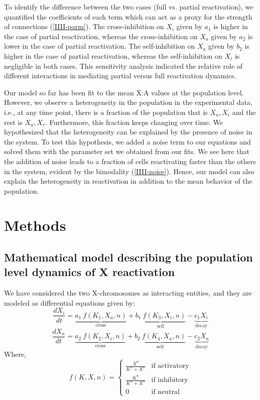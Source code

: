 \documentclass[11pt,a4paper]{article}
\begin{document}
To identify the difference between the two cases (full vs. partial reactivation), we quantified the coefficients of each term which can act as a proxy for the strength of connections (\autoref{IIII-parm}). The cross-inhibition on $X_i$ given by $a_1$ is higher in the case of partial reactivation, whereas the cross-inhibition on $X_a$ given by $a_2$ is lower in the case of partial reactivation. The self-inhibition on $X_a$ given by $b_2$ is higher in the case of partial reactivation, whereas the self-inhibition on $X_i$ is negligible in both cases. This sensitivity analysis indicated the relative role of different interactions in mediating partial versus full reactivation dynamics.

Our model so far has been fit to the mean X:A values at the population level. However, we observe a heterogeneity in the population in the experimental data, i.e., at any time point, there is a fraction of the population that is $X_a, X_i$ and the rest is $X_a, X_r$. Furthermore, this fraction keeps changing over time. We hypothesized that the heterogeneity can be explained by the presence of noise in the system. To test this hypothesis, we added a noise term to our equations and solved them with the parameter set we obtained from our fits. We see here that the addition of noise leads to a fraction of cells reactivating faster than the others in the system, evident by the bimodality (\autoref{IIII-noise}). Hence, our model can also explain the heterogeneity in reactivation in addition to the mean behavior of the population. 

\section{Methods}

\subsection*{Mathematical model describing the population level dynamics of X reactivation}
We have considered the two X-chromosomes as interacting entities, and they are modeled as differential equations given by:
\begin{equation}
    \frac{dX_i}{dt} = \underbrace{a_1\ f(K_1,X_a,n)}_\text{cross} + \underbrace{b_1\ f(K_3,X_i,n)}_\text{self} - \underbrace{c_1 X_i}_\text{decay} 
    \label{Xi-eq}
\end{equation}
\begin{equation}
    \frac{dX_a}{dt} = \underbrace{a_2\ f(K_2,X_i,n)}_\text{cross} + \underbrace{b_2\ f(K_4,X_a,n)}_\text{self} - \underbrace{c_2 X_a}_\text{decay} 
    \label{Xa-eq}
\end{equation}
Where, 
\begin{equation}
    f(K,X,n) = 
    \begin{cases} 
        \frac{{X}^n}{{K}^n+{X}^n} & \text{if activatory}\\
        \frac{{K}^n}{{K}^n+{X}^n} & \text{if inhibitory}\\
        0 & \text{if neutral}
    \end{cases}
\end{equation}
\end{document}
